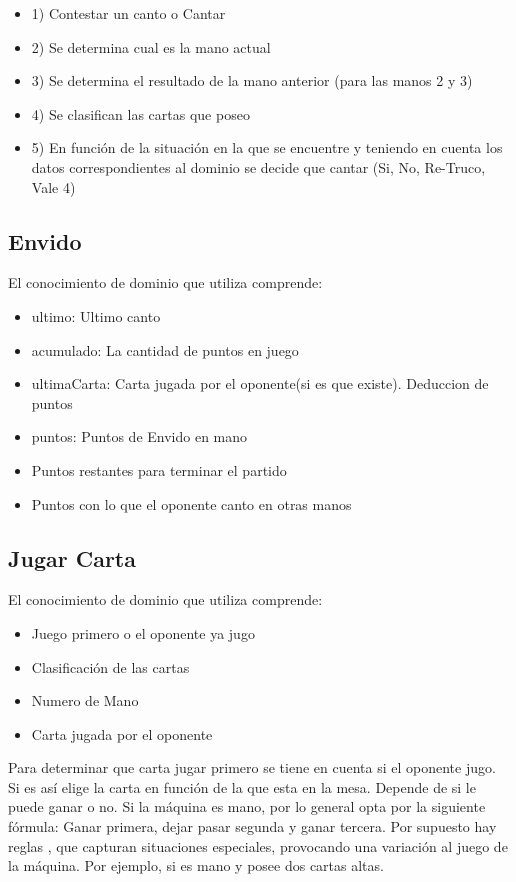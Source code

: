 \documentclass[12pt,a4paper]{article}
\begin{document}
\begin{itemize}
\begin{itemize}
\item 1) Contestar un canto o Cantar
\item 2) Se determina cual es la mano actual
\item 3) Se determina el resultado de la mano anterior (para las manos 2 y 3)
\item 4) Se clasifican las cartas que poseo
\item 5) En función de la situación en la que se encuentre y teniendo en cuenta los datos correspondientes al dominio
	   se decide que cantar (Si, No, Re-Truco, Vale 4)
\end{itemize}

\subsection{Envido}
El conocimiento de dominio que utiliza comprende:
\begin{itemize}
\item ultimo: Ultimo canto 
\item acumulado: La cantidad de puntos en juego
\item ultimaCarta: Carta jugada por el oponente(si es que existe). Deduccion de puntos
\item puntos: Puntos de Envido en mano
\item Puntos restantes para terminar el partido
\item Puntos con lo que el oponente canto en otras manos
\end{itemize}

\subsection{Jugar Carta}
El conocimiento de dominio que utiliza comprende:
\begin{itemize}
\item Juego primero o  el oponente ya jugo
\item Clasificaci\'on de las cartas
\item Numero de Mano
\item Carta jugada por el oponente
\end{itemize}

Para determinar que carta jugar primero se tiene en cuenta si el oponente jugo. Si es as\'i elige la carta en 
funci\'on de la que esta en la mesa. Depende de si le puede ganar o no.
Si la m\'aquina es mano, por lo general opta por la siguiente f\'ormula: Ganar primera, dejar pasar segunda y ganar tercera. 
Por supuesto hay reglas , que capturan situaciones especiales, provocando una variaci\'on al juego de la m\'aquina. Por ejemplo, si es mano y posee dos cartas altas.



\end{itemize}
\end{document}
